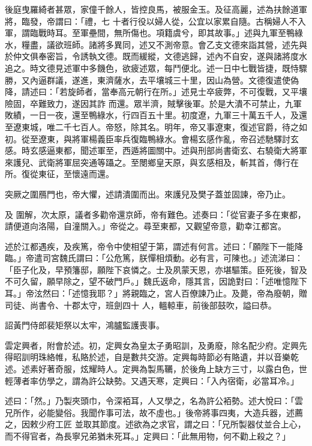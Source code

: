 \begin{pinyinscope}
 後庭曳羅綺者甚眾，家僮千餘人，皆控良馬，被服金玉。及征高麗，述為扶餘道軍將，臨發，帝謂曰：「禮，七
 十者行役以婦人從，公宜以家累自隨。古稱婦人不入軍，謂臨戰時耳。至軍壘間，無所傷也。項籍虞兮，即其故事。」述與九軍至鴨綠水，糧盡，議欲班師。諸將多異同，述又不測帝意。會乙支文德來詣其營，述先與於仲文俱奉密旨，令誘執文德。既而緩縱，文德逃歸，述內不自安，遂與諸將度水追之。時文德見述軍中多饑色，欲疲述眾，每鬥便北。述一日中七戰皆捷，既恃驟勝，又內逼群議，遂進，東濟薩水，去平壤城三十里，因山為營。文德復遣使偽降，請述曰：「若旋師者，當奉高元朝行在所。」述見士卒疲弊，不可復戰，又平壤險固，卒難致力，遂因其詐
 而還。眾半濟，賊擊後軍。於是大潰不可禁止，九軍敗績，一日一夜，還至鴨綠水，行四百五十里。初度遼，九軍三十萬五千人，及還至遼東城，唯二千七百人。帝怒，除其名。明年，帝又事遼東，復述官爵，待之如初。從至遼東，與將軍楊義臣率兵復臨鴨綠水。會楊玄感作亂，帝召述馳驛討玄感。時玄感逼東都，聞述軍至，西遁將圖關中。述與刑部尚書衛玄、右驍衛大將軍來護兒、武衛將軍屈突通等躡之。至閿鄉皇天原，與玄感相及，斬其首，傳行在所。復從東征，至懷遠而還。



 突厥之圍鴈門也，帝大懼，述請潰圍而出。來護兒及樊子蓋並固諫，帝乃止。



 及
 圍解，次太原，議者多勸帝還京師，帝有難色。述奏曰：「從官妻子多在東都，請便道向洛陽，自潼關入。」帝從之。尋至東都，又觀望帝意，勸幸江都宮。



 述於江都遇疾，及疾篤，帝令中使相望于第，謂述有何言。述曰：「願陛下一能降臨。」帝遣司宮魏氏謂曰：「公危篤，朕憚相煩動。必有言，可陳也。」述流涕曰：「臣子化及，早預籓邸，願陛下哀憐之。士及夙蒙天恩，亦堪驅策。臣死後，智及不可久留，願早除之，望不破門戶。」魏氏返命，隱其言，因詭對曰：「述唯憶陛下耳。」帝泫然曰：「述憶我耶？」將親臨之，宮人百僚諫乃止。及薨，帝為廢朝，贈司徒、尚書令、十郡太守，班劍四十
 人，轀輬車，前後部鼓吹，謚曰恭。



 詔黃門侍郎裴矩祭以太牢，鴻臚監護喪事。



 雲定興者，附會於述。初，定興女為皇太子勇昭訓，及勇廢，除名配少府。定興先得昭訓明珠絡帷，私賂於述，自是數共交游。定興每時節必有賂遺，并以音樂乾述。述素好著奇服，炫耀時人。定興為製馬韉，於後角上缺方三寸，以露白色，世輕薄者率仿學之，謂為許公缺勢。又遇天寒，定興曰：「入內宿衛，必當耳冷。」



 述曰：「然。」乃製夾頭巾，令深袹耳，人又學之，名為許公袹勢。述大悅曰：「雲兄所作，必能變俗。我聞作事可法，故不虛也。」後帝將事四夷，大造兵器，述薦之，因敕少府工匠
 並取其節度。述欲為之求官，謂之曰：「兄所製器仗並合上心，而不得官者，為長寧兄弟猶未死耳。」定興曰：「此無用物，何不勸上殺之？」




\end{pinyinscope}

